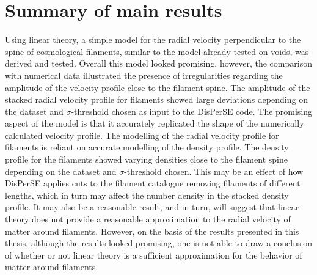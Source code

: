 \section{Summary of main results}\label{sec:mainresults}
Using linear theory, a simple model for the radial velocity perpendicular to the spine of cosmological filaments, similar to the model already tested on voids, was derived and tested. Overall this model looked promising, however, the comparison with numerical data illustrated the presence of irregularities regarding the amplitude of the velocity profile close to the filament spine. The amplitude of the stacked radial velocity profile for filaments showed large deviations depending on the dataset and $\sigma$-threshold chosen as input to the DisPerSE code. The promising aspect of the model is that it accurately replicated the shape of the numerically calculated velocity profile. The modelling of the radial velocity profile for filaments is reliant on accurate modelling of the density profile. The density profile for the filaments showed varying densities close to the filament spine depending on the dataset and $\sigma$-threshold chosen. This may be an effect of how DisPerSE applies cuts to the filament catalogue removing filaments of different lengths, which in turn may affect the number density in the stacked density profile. It may also be a reasonable result, and in turn, will suggest that linear theory does not provide a reasonable approximation to the radial velocity of matter around filaments. However, on the basis of the results presented in this thesis, although the results looked promising, one is not able to draw a conclusion of whether or not linear theory is a sufficient approximation for the behavior of matter around filaments.\\\indent

